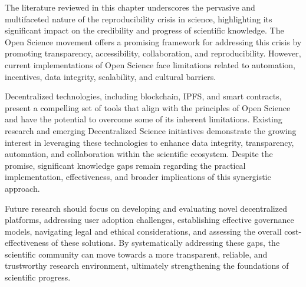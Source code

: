 \documentclass{article}
\begin{document}
The literature reviewed in this chapter underscores the pervasive and multifaceted nature of the reproducibility crisis in science, highlighting its significant impact on the credibility and progress of scientific knowledge. The Open Science movement offers a promising framework for addressing this crisis by promoting transparency, accessibility, collaboration, and reproducibility. However, current implementations of Open Science face limitations related to automation, incentives, data integrity, scalability, and cultural barriers.

Decentralized technologies, including blockchain, IPFS, and smart contracts, present a compelling set of tools that align with the principles of Open Science and have the potential to overcome some of its inherent limitations. Existing research and emerging Decentralized Science initiatives demonstrate the growing interest in leveraging these technologies to enhance data integrity, transparency, automation, and collaboration within the scientific ecosystem. Despite the promise, significant knowledge gaps remain regarding the practical implementation, effectiveness, and broader implications of this synergistic approach.

Future research should focus on developing and evaluating novel decentralized platforms, addressing user adoption challenges, establishing effective governance models, navigating legal and ethical considerations, and assessing the overall cost-effectiveness of these solutions. By systematically addressing these gaps, the scientific community can move towards a more transparent, reliable, and trustworthy research environment, ultimately strengthening the foundations of scientific progress.








\end{document}
